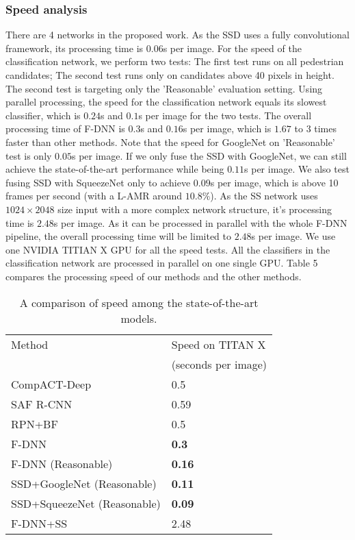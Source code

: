 \documentclass[10pt,letterpaper]{article}
\begin{document}
\subsubsection{Speed analysis}
There are 4 networks in the proposed work. As the SSD uses a fully convolutional framework, its processing time is $0.06$s per image. For the speed of the classification network, we perform two tests: The first test runs on all pedestrian candidates; The second test runs only on candidates above 40 pixels in height. The second test is targeting only the 'Reasonable' evaluation setting. Using parallel processing, the speed for the classification network equals its slowest classifier, which is $0.24$s and $0.1$s per image for the two tests. The overall processing time of F-DNN is $0.3$s and $0.16$s per image, which is $1.67$ to $3$ times faster than other methods. Note that the speed for GoogleNet on 'Reasonable' test is only $0.05$s per image. If we only fuse the SSD with GoogleNet, we can still achieve the state-of-the-art performance while being $0.11$s per image. We also test fusing SSD with SqueezeNet \cite{SqueezeNet} only to achieve $0.09$s per image, which is above 10 frames per second (with a L-AMR around $10.8\%$). As the SS network uses $1024\times2048$ size input with a more complex network structure, it's processing time is $2.48$s per image. As it can be processed in parallel with the whole F-DNN pipeline, the overall processing time will be limited to $2.48$s per image. We use one NVIDIA TITIAN X GPU for all the speed tests. All the classifiers in the classification network are processed in parallel on one single GPU. Table 5 compares the processing speed of our methods and the other methods.

\begin{table}
\begin{center}
\begin{tabular}{|l|l|}
\hline
Method & Speed on TITAN X \\
&(seconds per image)\\
\hline\hline
CompACT-Deep & 0.5\\
SAF R-CNN & 0.59\\
RPN+BF & 0.5\\
F-DNN & \textbf{0.3}\\
F-DNN (Reasonable) & \textbf{0.16} \\
SSD+GoogleNet (Reasonable) & \textbf{0.11} \\
SSD+SqueezeNet (Reasonable) & \textbf{0.09} \\
F-DNN+SS & 2.48\\
\hline
\end{tabular}
\end{center}
\caption{A comparison of speed among the state-of-the-art models.}
\end{table}
\end{document}
